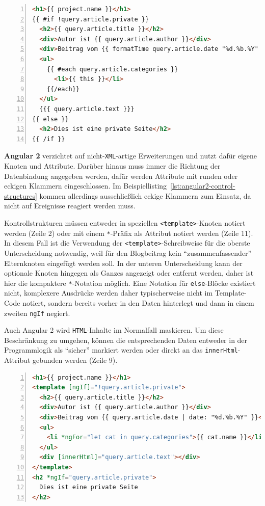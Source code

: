 \begin{lstlisting}[float=h, language=HTML, numbers=left, caption={Blogartikel mit Handlebars}, label={lst:handlebars-control-structures}]
<h1>{{ project.name }}</h1>
{{ #if !query.article.private }}
  <h2>{{ query.article.title }}</h2>
  <div>Autor ist {{ query.article.author }}</div>
  <div>Beitrag vom {{ formatTime query.article.date "%d.%b.%Y" }}</div>
  <ul>
    {{ #each query.article.categories }}
      <li>{{ this }}</li>
    {{/each}}
  </ul>
  {{{ query.article.text }}}
{{ else }}
  <h2>Dies ist eine private Seite</h2>
{{ /if }}
\end{lstlisting}

\textbf{Angular 2} verzichtet auf nicht-\texttt{XML}-artige Erweiterungen und nutzt dafür eigene Knoten und Attribute. Darüber hinaus muss immer die Richtung der Datenbindung angegeben werden, dafür werden Attribute mit runden oder eckigen Klammern eingeschlossen. Im Beispiellisting~\ref{lst:angular2-control-structures} kommen allerdings ausschließlich eckige Klammern zum Einsatz, da nicht auf Ereignisse reagiert werden muss.

Kontrollstrukturen müssen entweder in speziellen \texttt{<template>}-Knoten notiert werden (Zeile 2) oder mit einem \texttt{*}-Präfix als Attribut notiert werden (Zeile 11). In diesem Fall ist die Verwendung der \texttt{<template>}-Schreibweise für die oberste Unterscheidung notwendig, weil für den Blogbeitrag kein "`zusammenfassender"' Elternknoten eingefügt werden soll. In der unteren Unterscheidung kann der optionale Knoten hingegen als Ganzes angezeigt oder entfernt werden, daher ist hier die kompaktere \texttt{*}-Notation möglich. Eine Notation für \texttt{else}-Blöcke existiert nicht, komplexere Ausdrücke werden daher typischerweise nicht im Template-Code notiert, sondern bereits vorher in den Daten hinterlegt und dann in einem zweiten \texttt{ngIf} negiert.

Auch Angular 2 wird \texttt{HTML}-Inhalte im Normalfall maskieren. Um diese Beschränkung zu umgehen, können die entsprechenden Daten entweder in der Programmlogik als "`sicher"' markiert werden oder direkt an das \texttt{innerHtml}-Attribut gebunden werden (Zeile 9).

\begin{lstlisting}[float=h, language=HTML, numbers=left, caption={Blogartikel mit Angular 2}, label={lst:angular2-control-structures}]
<h1>{{ project.name }}</h1>
<template [ngIf]="!query.article.private">
  <h2>{{ query.article.title }}</h2>
  <div>Autor ist {{ query.article.author }}</div>
  <div>Beitrag vom {{ query.article.date | date: "%d.%b.%Y" }}</div>
  <ul>
    <li *ngFor="let cat in query.categories">{{ cat.name }}</li>
  </ul>
  <div [innerHtml]="query.article.text"></div>
</template>
<h2 *ngIf="query.article.private">
  Dies ist eine private Seite
</h2>
\end{lstlisting}

